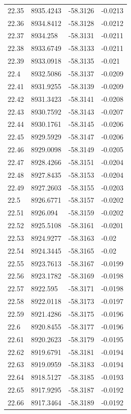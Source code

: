 \begin{table}[H]
\begin{tabular}{llll}
22.35 & 8935.4243 & -58.3126 & -0.0213 \\
22.36 & 8934.8412 & -58.3128 & -0.0212 \\
22.37 & 8934.258 & -58.3131 & -0.0211 \\
22.38 & 8933.6749 & -58.3133 & -0.0211 \\
22.39 & 8933.0918 & -58.3135 & -0.021 \\
22.4 & 8932.5086 & -58.3137 & -0.0209 \\
22.41 & 8931.9255 & -58.3139 & -0.0209 \\
22.42 & 8931.3423 & -58.3141 & -0.0208 \\
22.43 & 8930.7592 & -58.3143 & -0.0207 \\
22.44 & 8930.1761 & -58.3145 & -0.0206 \\
22.45 & 8929.5929 & -58.3147 & -0.0206 \\
22.46 & 8929.0098 & -58.3149 & -0.0205 \\
22.47 & 8928.4266 & -58.3151 & -0.0204 \\
22.48 & 8927.8435 & -58.3153 & -0.0204 \\
22.49 & 8927.2603 & -58.3155 & -0.0203 \\
22.5 & 8926.6771 & -58.3157 & -0.0202 \\
22.51 & 8926.094 & -58.3159 & -0.0202 \\
22.52 & 8925.5108 & -58.3161 & -0.0201 \\
22.53 & 8924.9277 & -58.3163 & -0.02 \\
22.54 & 8924.3445 & -58.3165 & -0.02 \\
22.55 & 8923.7613 & -58.3167 & -0.0199 \\
22.56 & 8923.1782 & -58.3169 & -0.0198 \\
22.57 & 8922.595 & -58.3171 & -0.0198 \\
22.58 & 8922.0118 & -58.3173 & -0.0197 \\
22.59 & 8921.4286 & -58.3175 & -0.0196 \\
22.6 & 8920.8455 & -58.3177 & -0.0196 \\
22.61 & 8920.2623 & -58.3179 & -0.0195 \\
22.62 & 8919.6791 & -58.3181 & -0.0194 \\
22.63 & 8919.0959 & -58.3183 & -0.0194 \\
22.64 & 8918.5127 & -58.3185 & -0.0193 \\
22.65 & 8917.9295 & -58.3187 & -0.0192 \\
22.66 & 8917.3464 & -58.3189 & -0.0192 \\

\end{tabular}
\end{table}
